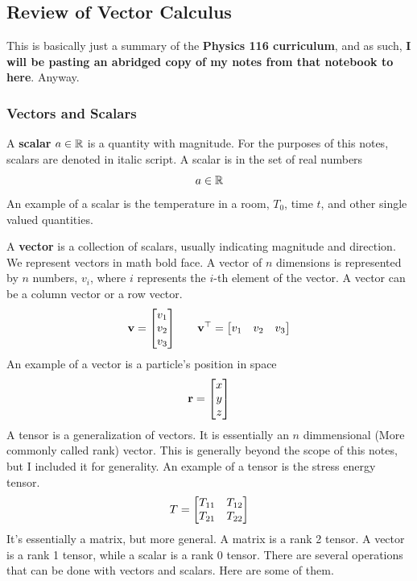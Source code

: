 \subsection{Review of Vector Calculus}
	This is basically just a summary of the {\color{red} \textbf{Physics 116 curriculum}}, and as such, 
	\textbf{I will be pasting an abridged copy of my notes from that notebook to here}. Anyway.
	\subsubsection{Vectors and Scalars}
		A \textbf{scalar} $a\in\mathbb{R}$ is a quantity with magnitude. For the purposes of this notes, scalars are denoted in italic script. A scalar is in the set of real numbers
        \begin{equation}
            a\in\mathbb{R}
        \end{equation}
        An example of a scalar is the temperature in a room, $T_0$, time $t$, and other single valued quantities. 

        A \textbf{vector} is a collection of scalars, usually indicating magnitude and direction. We represent vectors in math bold face. A vector of $n$ dimensions is represented by $n$ numbers, $v_i$, where $i$ represents the $i$-th element of the vector. A vector can be a column vector or a row vector.
        \begin{equation}
			\vb{v}=\mqty[v_1\\v_2\\v_3]\qquad \vb{v}^\top=\mqty[v_1&v_2&v_3]
        \end{equation}
        An example of a vector is a particle's position in space 
        \begin{equation}
			\vb{r}=\mqty[x\\y\\z]
        \end{equation}
        A tensor is a generalization of vectors. It is essentially an $n$ dimmensional (More commonly called rank) vector. This is generally beyond the scope of this notes, but I included it for generality. An example of a tensor is the stress energy tensor. 
        \begin{equation}
            T=\mqty[
                T_{11}&T_{12}\\
                T_{21}&T_{22}
				]
        \end{equation}
        It's essentially a matrix, but more general. A matrix is a rank 2 tensor. A vector is a rank 1 tensor, while a scalar is a rank 0 tensor.
            There are several operations that can be done with vectors and scalars. Here are some of them.
